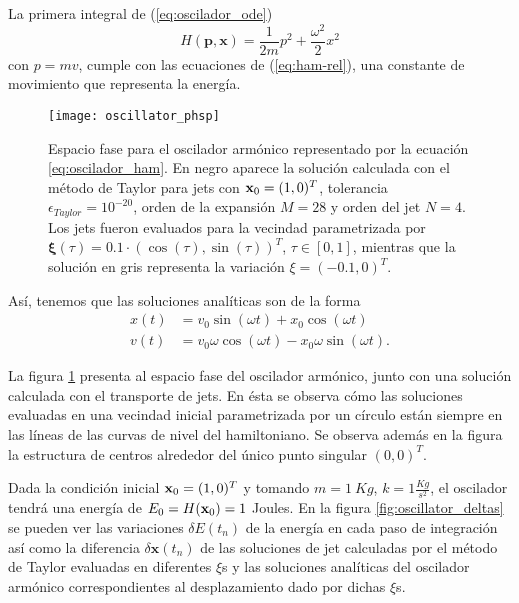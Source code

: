 La primera integral de (\ref{eq:oscilador_ode})
\begin{equation}
 H(\mathbf{p},\mathbf{x}) = \frac{1}{2m}p^2 + \frac{\omega^2}{2} x^2
 \label{eq:oscilador_ham}
\end{equation}
con $p=mv$, cumple con las ecuaciones de (\ref{eq:ham-rel}), una constante de movimiento que representa la energía.

\begin{figure}[h!]
 \centering
 \texttt{[image: oscillator\_phsp]}
 \caption{Espacio fase para el oscilador armónico representado por la ecuación \ref{eq:oscilador_ham}. En negro aparece la solución calculada con el método de Taylor para jets con $\mathbf{x}_0 = (1,0)^T$, tolerancia $\epsilon_{Taylor} = 10^{-20}$, orden de la expansión $M = 28$ y orden del jet $N=4$. Los jets fueron evaluados para la vecindad parametrizada por $\mathbf{\xi}(\tau) = 0.1\cdot \left( \cos(\tau), \sin(\tau) \right)^T$, $\tau \in [0,1]$, mientras que la solución en gris representa la variación $\xi = (-0.1,0)^T$.}
 \label{fig:oscilador_phsp}
\end{figure}

Así, tenemos que las soluciones analíticas son de la forma 
\begin{align}
 x(t) &= v_{0}\sin{(\omega t)} + x_{0}\cos{(\omega t)} \nonumber \\ 
 v(t) &= v_{0}\omega\cos{(\omega t)} - x_{0}\omega\sin{(\omega t)}. 
 \label{eq:oscilador_analytical}
\end{align}

La figura \ref{fig:oscilador_phsp} presenta al espacio fase del oscilador armónico, junto con una solución calculada con el transporte de jets. En ésta se observa cómo las soluciones evaluadas en una vecindad inicial parametrizada por un círculo están siempre en las líneas de las curvas de nivel del hamiltoniano. Se observa además en la figura la estructura de centros alrededor del único punto singular $(0,0)^T$.

Dada la condición inicial $\mathbf{x}_0 = (1,0)^T$ y tomando $m = 1 \ Kg$, $k = 1 \frac{Kg}{s^2}$, el oscilador tendrá una energía de $E_0 = H(\mathbf{x}_0) = 1$ Joules. En la figura \ref{fig:oscillator_deltas} se pueden ver las variaciones $\delta E(t_n)$ de la energía en cada paso de integración así como la diferencia $\delta \mathbf{x}(t_n)$ de las soluciones de jet calculadas por el método de Taylor evaluadas en diferentes $\xi$s y las soluciones analíticas del oscilador armónico correspondientes al desplazamiento dado por dichas $\xi$s.

